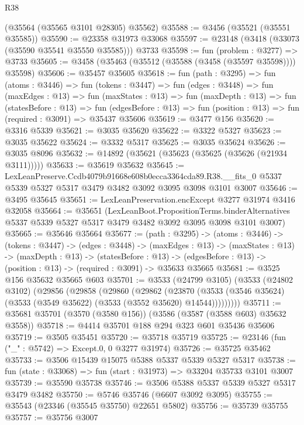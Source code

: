 \begin{lexlean}{R38}
\begin{coremodule}
    (@35564 (@35565 @3101 @28305) @35562)
@35588 := @3456 (@35521 (@35551 @35585))
@35590 := @23358 @31973 @33068
@35597 := @23148 (@3418 (@33073 (@35590 @35541 @35550 @35585))) @3733
@35598 := fun (problem : @3277) => @3733
@35605 := @3458 (@35463 (@35512 (@35588 (@3458 (@35597 @35598)))) @35598)
@35606 := @35457 @35605
@35618 := fun (path : @3295) =>
  fun (atoms : @3446) =>
  fun (tokens : @3447) =>
  fun (edges : @3448) =>
  fun (maxEdges : @13) =>
  fun (maxStates : @13) =>
  fun (maxDepth : @13) =>
  fun (statesBefore : @13) =>
  fun (edgesBefore : @13) => fun (position : @13) => fun (required : @3091) => @35437 @35606
@35619 := @3477 @156
@35620 := @3316 @5339
@35621 := @3035 @35620
@35622 := @3322 @5327
@35623 := @3035 @35622
@35624 := @3332 @5317
@35625 := @3035 @35624
@35626 := @3035 @8096
@35632 := @14892 (@35621 (@35623 (@35625 (@35626 (@21934 @3111)))))
@35633 := @35619 @35632
@35645 := LexLeanPreserve.Ccdb4079b91668e608b0ecca3364cda89.R38.__fits_0
    @5337
    @5339
    @5327
    @5317
    @3479
    @3482
    @3092
    @3095
    @3098
    @3101
    @3007
@35646 := @3495 @35645
@35651 := LexLeanPreservation.encExcept @3277 @31974 @3416 @32058
@35664 := @35651
    (LexLeanBoot.PropositionTerms.binderAlternatives
      @5337
      @5339
      @5327
      @5317
      @3479
      @3482
      @3092
      @3095
      @3098
      @3101
      @3007)
@35665 := @35646 @35664
@35677 := (path : @3295) ->
  (atoms : @3446) ->
  (tokens : @3447) ->
  (edges : @3448) ->
  (maxEdges : @13) ->
  (maxStates : @13) ->
  (maxDepth : @13) ->
  (statesBefore : @13) ->
  (edgesBefore : @13) -> (position : @13) -> (required : @3091) -> @35633 @35665
@35681 := @3525 @156 @35632 @35665 @603
@35701 := @3533
    (@24799 @3105)
    (@3533
      (@24802 @3102)
      (@29856
        (@29858
          (@29860
            (@29862
              (@23870
                (@3533 (@3546 @35624) (@3533 (@3549 @35622) (@3533 (@3552 @35620) @14544)))))))))
@35711 := @35681 @35701 (@3570 (@3580 @156)) (@3586 (@3587 (@3588 @603) @35632 @3558))
@35718 := @4414 @35701 @188 @294 @323 @601 @35436 @35606
@35719 := @3505 @35451
@35720 := @35718 @35719
@35725 := @23146 (fun ("_" : @5742) => Except.{0, 0} @3277 @31974)
@35726 := @35725 @35462
@35733 := @3506 @15439 @15075 @5388 @5337 @5339 @5327 @5317
@35738 := fun (state : @33068) => fun (start : @31973) => @33204 @35733 @3101 @3007
@35739 := @35590 @35738
@35746 := @3506 @5388 @5337 @5339 @5327 @5317 @3479 @3482
@35750 := @5746 @35746 (@6607 @3092 @3095)
@35755 := @35543 (@23346 (@35545 @35750) @22651 @5802)
@35756 := @35739 @35755
@35757 := @35756 @3007

\end{coremodule}
\end{lexlean}
